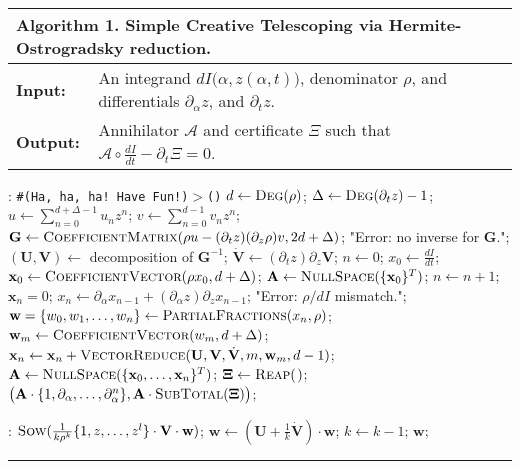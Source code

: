 \documentclass[nofootinbib,preprint]{revtex4-1}
\begin{document}
\begin{table*}
\begin{tabularx}{\textwidth}{l l}
\hline
\multicolumn{2}{l}{\textbf{Algorithm 1.} Simple Creative Telescoping via Hermite-Ostrogradsky reduction. }  \\
\hline
\textbf{Input:}  & An integrand $dI\big(\alpha,z(\alpha,t)\big)$, 
                   denominator $\rho$, and differentials $\partial_{\alpha}z$, and $\partial_{t}z$.   \\
\textbf{Output:} \hspace{0.5cm} & Annihilator $\mathcal{A}$ and certificate $\Xi$ 
                                  such that $\mathcal{A}\circ \frac{dI}{dt} - \partial_t\Xi=0$. \\
\hline
\end{tabularx}
\begin{algorithmic}[1]
:
\hspace{2.6cm} \texttt{\#(Ha, ha, ha! Have Fun!)$>$\;\big(\big)}
\State $ d \gets \Call{Deg}{\rho}$; $\Delta \gets \Call{Deg}{\partial_{t} z}-1$; 
\State $u\gets  \sum_{n=0}^{d+\Delta-1}u_{n}z^n$; $v \gets \sum_{n=0}^{d-1}v_{n}z^n $;
\State $ \mathbf{G} \gets \Call{CoefficientMatrix}{\rho u - (\partial_{t} z)(\partial_z\rho) v,2d+\Delta }$; 
 \Return "Error: no inverse for $\mathbf{G}$.";
\Else \; $ (\mathbf{U},\mathbf{V}) \gets$ decomposition of $\mathbf{G}^{-1}$; $\dot{\mathbf{V}} \gets (\partial_t z )\partial_z\mathbf{V}$;
\EndIf
\State $n\gets 0$; $x_0\gets\frac{dI}{dt}$; $ \mathbf{x}_0 \gets \Call{CoefficientVector}{\rho x_0 ,d+\Delta}$;  
\State $\mathbf{A}\gets\Call{NullSpace}{\{\mathbf{x}_0\}^T}$;
  $n\gets n+1$; $\mathbf{x}_n=0$;
\State $x_n\gets\partial_{\alpha}x_{n-1}+(\partial_{\alpha}z)\partial_z x_{n-1} $;
     \State \Return "Error: $\rho/dI$ mismatch."; \EndIf
\State $\mathbf{w}=\{w_0,w_1,\ldots,w_n\} \gets \Call{PartialFractions}{x_n,\rho} $;
        \State $\mathbf{w}_m \gets \Call{CoefficientVector}{w_m,d+\Delta}$;
        \State $\mathbf{x}_n \gets \mathbf{x}_n 
        + \Call{VectorReduce}{\mathbf{U},\mathbf{V},\dot{\mathbf{V}},m,\mathbf{w}_m,d-1} $;
      \EndFor
\State $\mathbf{A}\gets\Call{NullSpace}{\{\mathbf{x}_0,\ldots,\mathbf{x}_n\}^T}$;
\EndWhile
\State $\mathbf{\Xi} \gets \Call{Reap}{\;\!}$; 
\Return $\big(\mathbf{A}\cdot\{1,\partial_{\alpha},\ldots,\partial_{\alpha}^n\},
\mathbf{A}\cdot\Call{SubTotal}{\mathbf{\Xi}}\big)$;
\EndFunction

:
\State $\Call{Sow}{\frac{1}{k \rho^k}\{1,z,\ldots,z^l\} \cdot \textbf{V} \cdot \mathbf{w} }$;
\State $\mathbf{w} \gets (\mathbf{U} +\frac{1}{k} \dot{\textbf{V}}) \cdot \mathbf{w}$;
\State $k \gets k-1 $;
\EndWhile
\State \Return $\textbf{w}$;
\EndFunction
\end{algorithmic}
\rule{\textwidth}{.01cm}
\end{table*}
\end{document}
